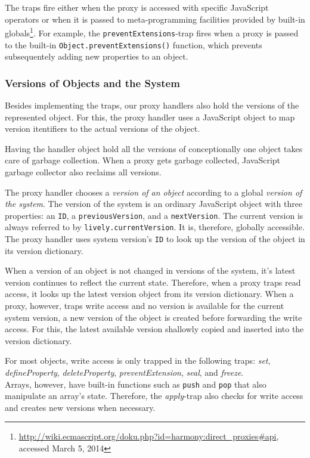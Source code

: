 The traps fire either when the proxy is accessed with specific JavaScript operators or when it is passed to meta-programming facilities provided by built-in globals\footnote{\url{http://wiki.ecmascript.org/doku.php?id=harmony:direct_proxies\#api}, accessed March 5, 2014}.
For example, the \lstinline{preventExtensions}-trap fires when a proxy is passed to the built-in \lstinline{Object.preventExtensions()} function, which prevents subsequentely adding new properties to an object.


\subsubsection{Versions of Objects and the System}

Besides implementing the traps, our proxy handlers also hold the versions of the represented object.
For this, the proxy handler uses a JavaScript object to map version itentifiers to the actual versions of the object.

Having the handler object hold all the versions of conceptionally one object takes care of garbage collection.
When a proxy gets garbage collected, JavaScript garbage collector also reclaims all versions.

The proxy handler chooses a \emph{version of an object} according to a global \emph{version of the system}.
The version of the system is an ordinary JavaScript object with three properties: an \lstinline{ID}, a \lstinline{previousVersion}, and a \lstinline{nextVersion}.
The current version is always referred to by \lstinline{lively.currentVersion}.
It is, therefore, globally accessible.
The proxy handler uses system version's \lstinline{ID} to look up the version of the object in its version dictionary.

When a version of an object is not changed in versions of the system, it's latest version continues to reflect the current state.
Therefore, when a proxy traps read access, it looks up the latest version object from its version dictionary.
When a proxy, however, traps write access and no version is available for the current system version, a new version of the object is created before forwarding the write access.
For this, the latest available version shallowly copied and inserted into the version dictionary.

For most objects, write access is only trapped in the following traps: \emph{set}, \emph{defineProperty}, \emph{deleteProperty}, \emph{preventExtension}, \emph{seal}, and \emph{freeze}.\\
Arrays, however, have built-in functions such as \lstinline{push} and \lstinline{pop} that also manipulate an array's state.
Therefore, the \emph{apply}-trap also checks for write access and creates new versions when necessary.

